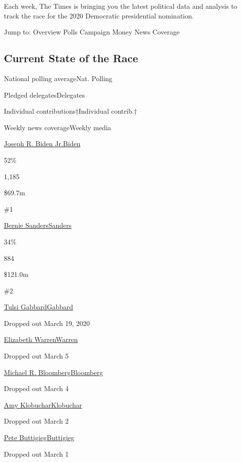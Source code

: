 Each week, The Times is bringing you the latest political data and
analysis to track the race for the 2020 Democratic presidential
nomination.

Jump to: Overview Polls Campaign Money News Coverage

\hypertarget{current-state-of-the-race}{%
\subsection{Current State of the Race}\label{current-state-of-the-race}}

National polling averageNat. Polling

Pledged delegatesDelegates

Individual contributions†Individual contrib.†

Weekly news coverageWeekly media

\href{https://www.nytimes.com/interactive/2020/us/elections/joe-biden.html}{Joseph
R. Biden Jr.Biden}

52\%

1,185

\$69.7m

\#1

\href{https://www.nytimes.com/interactive/2020/us/elections/bernie-sanders.html}{Bernie
SandersSanders}

34\%

884

\$121.0m

\#2

\href{https://www.nytimes.com/interactive/2020/us/elections/tulsi-gabbard.html}{Tulsi
GabbardGabbard}

Dropped out March 19, 2020

\href{https://www.nytimes.com/interactive/2020/us/elections/elizabeth-warren.html}{Elizabeth
WarrenWarren}

Dropped out March 5

\href{https://www.nytimes.com/interactive/2020/us/elections/michael-bloomberg.html}{Michael
R. BloombergBloomberg}

Dropped out March 4

\href{https://www.nytimes.com/interactive/2020/us/elections/amy-klobuchar.html}{Amy
KlobucharKlobuchar}

Dropped out March 2

\href{https://www.nytimes.com/interactive/2020/us/elections/pete-buttigieg.html}{Pete
ButtigiegButtigieg}

Dropped out March 1

